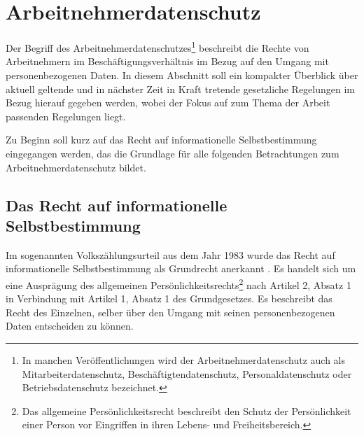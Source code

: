 \section{Arbeitnehmerdatenschutz}

\label{sec_basics_employee_privacy}


Der Begriff des Arbeitnehmerdatenschutzes\footnote{
  In manchen Veröffentlichungen wird der Arbeitnehmerdatenschutz auch als Mitarbeiterdatenschutz, Beschäftigtendatenschutz, Personaldatenschutz oder Betriebsdatenschutz bezeichnet.
}
beschreibt die Rechte von Arbeitnehmern im Beschäftigungsverhältnis im Bezug auf den Umgang mit personenbezogenen Daten. In diesem Abschnitt soll ein kompakter Überblick über aktuell geltende und in nächster Zeit in Kraft tretende gesetzliche Regelungen im Bezug hierauf gegeben werden, wobei der Fokus auf zum Thema der Arbeit passenden Regelungen liegt.

Zu Beginn soll kurz auf das Recht auf informationelle Selbstbestimmung eingegangen werden, das die Grundlage für alle folgenden Betrachtungen zum Arbeitnehmerdatenschutz bildet.

\subsection{Das Recht auf informationelle Selbstbestimmung}

Im sogenannten Volkszählungsurteil aus dem Jahr 1983 wurde das Recht auf informationelle Selbstbestimmung als Grundrecht anerkannt \cite{TODO}. 
Es handelt sich um eine Ausprägung des allgemeinen Persönlichkeitsrechts\footnote{
  Das allgemeine Persönlichkeitsrecht beschreibt den Schutz der Persönlichkeit einer Person vor Eingriffen in ihren Lebens- und Freiheitsbereich.
} nach Artikel 2, Absatz 1 in Verbindung mit Artikel 1, Absatz 1 des Grundgesetzes. Es beschreibt das Recht des Einzelnen, selber über den Umgang mit seinen personenbezogenen Daten entscheiden zu können. 

%    
%    
%        
    
